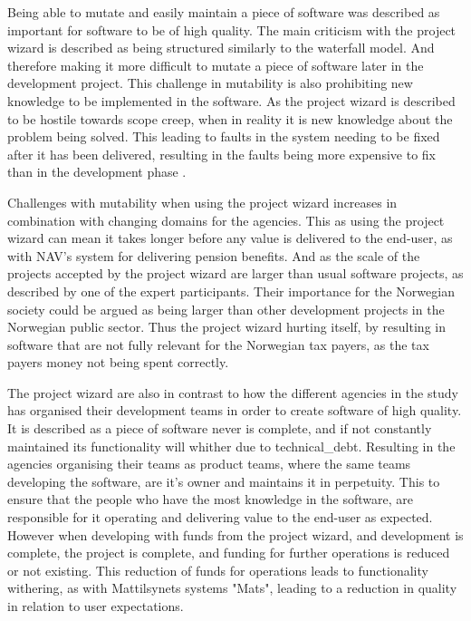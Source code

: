 Being able to mutate and easily maintain a piece of software was described as important for software to be of high quality. The main criticism with the project wizard is described as being structured similarly to the waterfall model. And therefore making it more difficult to mutate a piece of software later in the development project. This challenge in mutability is also prohibiting new knowledge to be implemented in the software. As the project wizard is described to be hostile towards scope creep, when in reality it is new knowledge about the problem being solved. This leading to faults in the system needing to be fixed after it has been delivered, resulting in the faults being more expensive to fix than in the development phase \cite{sh_2018}\cite{csw_2011}.

 Challenges with mutability when using the project wizard increases in combination with changing domains for the agencies. This as using the project wizard can mean it takes longer before any value is delivered to the end-user, as with NAV's system for delivering pension benefits. And as the scale of the projects accepted by the project wizard are larger than usual software projects, as described by one of the expert participants. Their importance for the Norwegian society could be argued as being larger than other development projects in the Norwegian public sector. Thus the project wizard hurting itself, by resulting in software that are not fully relevant for the Norwegian tax payers, as the tax payers money not being spent correctly.

The project wizard are also in contrast to how the different agencies in the study has organised their development teams in order to create software of high quality. It is described as a piece of software never is complete, and if not constantly maintained its functionality will whither due to \gls{technical_debt}. Resulting in the agencies organising their teams as product teams, where the same teams developing the software, are it's owner and maintains it in perpetuity. This to ensure that the people who have the most knowledge in the software, are responsible for it operating and delivering value to the end-user as expected. However when developing with funds from the project wizard, and development is complete, the project is complete, and funding for further operations is reduced or not existing. This reduction of funds for operations leads to functionality withering, as with Mattilsynets systems "Mats", leading to a reduction in quality in relation to user expectations.

